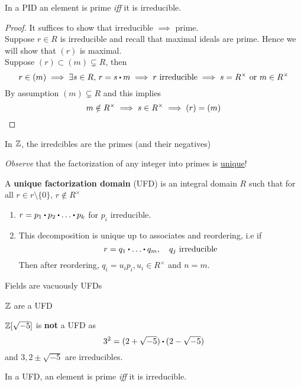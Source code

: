 \documentclass[../Main.tex]{subfiles}
\begin{document}
\begin{prop}[title = Element in PID is prime iff it is irreducible]
	In a PID an element is prime \textit{iff} it is irreducible.
\end{prop}
\begin{proof}
	It suffices to show that irreducible $\implies$ prime.\\
	Suppose $r\in R$ is irreducible and recall that maximal ideals are prime. Hence we will show that $(r)$ is maximal.\\
	Suppose $(r)\subset (m)\subsetneq R$, then
	\[r\in (m) \implies \exists s\in R,\, r=s\rdot m\implies r \text{ irreducible} \implies s=R^\times \text{ or } m\in R^\times\]
	By assumption $(m)\subsetneq R$ and this implies
	\[m\notin R^\times \implies s\in R^\times \implies (r) = (m)\qedhere\]
\end{proof}
\begin{example}
	In $\mathbb{Z}$, the irredcibles are the primes (and their negatives)
\end{example}
\textit{Observe} that the factorization of any integer into primes is \underline{unique}!
\begin{dfn}[title = Unique Factorization Domain]
	A \textbf{unique factorization domain} (UFD) is an integral domain $R$ such that for all $r\in r\setminus \{0\},\, r\notin R^\times$
	\begin{enumerate}
		\item $r=p_1\rdot p_2\rdot \dots\rdot p_k$ for $p_i$ irreducible.
		\item This decomposition is unique up to associates and reordering, i.e if 
		\[r=q_1\rdot \dots \rdot q_m,\quad q_j \text{ irreducible}\]
		Then after reordering, $q_i=u_ip_i, u_i\in R^\times$ and $n=m$.
	\end{enumerate}
\end{dfn}
\begin{example}
	Fields are vacuously UFDs
\end{example}
\begin{example}
	$\mathbb{Z}$ are a UFD
\end{example}
\begin{example}
	$\mathbb{Z}[\sqrt{-5}]$ is \textbf{not} a UFD as
	\[3^2=(2+\sqrt{-5})\rdot (2-\sqrt{-5})\]
	and $3,2\pm \sqrt{-5}$ are irreducibles.
\end{example}
\begin{prop}[title = Element in UFD is prime iff it is irreducible]
	In a UFD, an element is prime \textit{iff} it is irreducible.
\end{prop}
\end{document}
